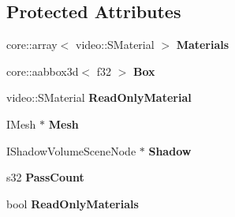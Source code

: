 \subsection*{Protected Attributes}
\begin{DoxyCompactItemize}
\item 
\hypertarget{classirr_1_1scene_1_1_c_mesh_scene_node_a53c67d768c3057a7caa8f19a55613b7e}{core\-::array$<$ video\-::\-S\-Material $>$ {\bfseries Materials}}\label{classirr_1_1scene_1_1_c_mesh_scene_node_a53c67d768c3057a7caa8f19a55613b7e}

\item 
\hypertarget{classirr_1_1scene_1_1_c_mesh_scene_node_afe5bc9c9284e25dd73b3979f22c5621a}{core\-::aabbox3d$<$ f32 $>$ {\bfseries Box}}\label{classirr_1_1scene_1_1_c_mesh_scene_node_afe5bc9c9284e25dd73b3979f22c5621a}

\item 
\hypertarget{classirr_1_1scene_1_1_c_mesh_scene_node_a3950b77480341c06c7f139e72685c0de}{video\-::\-S\-Material {\bfseries Read\-Only\-Material}}\label{classirr_1_1scene_1_1_c_mesh_scene_node_a3950b77480341c06c7f139e72685c0de}

\item 
\hypertarget{classirr_1_1scene_1_1_c_mesh_scene_node_a07abda62ed6d1581e077b85bee2507a8}{I\-Mesh $\ast$ {\bfseries Mesh}}\label{classirr_1_1scene_1_1_c_mesh_scene_node_a07abda62ed6d1581e077b85bee2507a8}

\item 
\hypertarget{classirr_1_1scene_1_1_c_mesh_scene_node_aa5e1e5be1b0880c5ad1ee649b7d7826f}{I\-Shadow\-Volume\-Scene\-Node $\ast$ {\bfseries Shadow}}\label{classirr_1_1scene_1_1_c_mesh_scene_node_aa5e1e5be1b0880c5ad1ee649b7d7826f}

\item 
\hypertarget{classirr_1_1scene_1_1_c_mesh_scene_node_a20486f2fbed0d9510f9434abde712263}{s32 {\bfseries Pass\-Count}}\label{classirr_1_1scene_1_1_c_mesh_scene_node_a20486f2fbed0d9510f9434abde712263}

\item 
\hypertarget{classirr_1_1scene_1_1_c_mesh_scene_node_ab9f2083b86df7ca87fc9ee40c971d444}{bool {\bfseries Read\-Only\-Materials}}\label{classirr_1_1scene_1_1_c_mesh_scene_node_ab9f2083b86df7ca87fc9ee40c971d444}

\end{DoxyCompactItemize}


